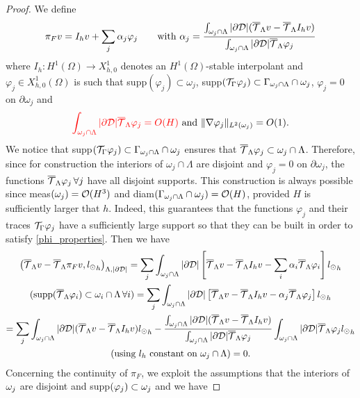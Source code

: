 \begin{proof}
We define
\begin{equation*}
\pi_F v = I_h v + \sum _j \alpha _j \varphi _j \qquad \text{with }\alpha_j =\frac{\int_{\omega _j \cap \Lambda}|\partial\mathcal{D}| ({\overline{\mathcal{T}}_\Lambda} v-{\overline{\mathcal{T}}_\Lambda} I_h v)}{\int_{\omega _j \cap \Lambda}|\partial\mathcal{D}|{\overline{\mathcal{T}}_\Lambda} \varphi _j}
\end{equation*}
where $I_h: H^1(\Omega) \rightarrow X_{h,0}^1$ denotes an $H^1(\Omega)$-stable interpolant
and $\varphi_j \in X_{h,0}^1(\Omega)$ is such that supp$(\varphi_j)\subset \omega_j$, supp$({\mathcal{T}_\Gamma} \varphi _j) \subset \Gamma_{\omega _j\cap \Lambda}\cap \omega_j$, $\varphi_j =0$ on $\partial \omega _j$ and 
\begin{equation}\label{phi_properties}
 {\color{red}\int_{\patch\cap \Lambda}|\DD|\mtrace \varphi_j=O(H)} \text{ and } \|\nabla \varphi _j\|_{L^2(\omega _j)}=O(1). 
\end{equation}
We notice that supp$({\mathcal{T}_\Gamma} \varphi_j) \subset \Gamma_{\omega _j\cap \Lambda}\cap \omega_j$ ensures that ${\overline{\mathcal{T}}_\Lambda} \varphi_j \subset \omega_j\cap \Lambda$. Therefore, since for construction the interiors of $\omega_j\cap \Lambda$  are disjoint and $\varphi _j = 0 $ on $\partial \omega_j$,  the functions ${\overline{\mathcal{T}}_\Lambda} \varphi_j\, \forall j$ have all disjoint supports. This construction is always possible since meas$(\omega _j) = \mathcal{O}(H^3)$ and diam$(\Gamma_{\omega _j\cap \Lambda} \cap \omega_j)=\mathcal{O}(H)$, provided $H$ is sufficiently larger that $h$. Indeed, this guarantees that the functions $\varphi _j$ and their traces ${\mathcal{T}_\Gamma} \varphi _j$ have a sufficiently large support so that they can be built in order to satisfy \eqref{phi_properties}.
Then we have
\begin{multline*}
\left({\overline{\mathcal{T}}_\Lambda} v - {\overline{\mathcal{T}}_\Lambda} \pi _F v  , {l_{\odot}}_h\right)_{\Lambda, |\partial\mathcal{D}|} = \sum _j \int_{\omega _j\cap \Lambda} |\partial\mathcal{D} |\left[ {\overline{\mathcal{T}}_\Lambda} v-{\overline{\mathcal{T}}_\Lambda} I_h v-\sum _i \alpha_i {\overline{\mathcal{T}}_\Lambda} \varphi _i \right]{l_{\odot}}_h \\
(\text{supp} ({\overline{\mathcal{T}}_\Lambda} \varphi _i )\subset \omega _i\cap \Lambda \, \forall i)  =\sum _j \int_{\omega _j\cap \Lambda}|\partial\mathcal{D}| \left[ {\overline{\mathcal{T}}_\Lambda} v-{\overline{\mathcal{T}}_\Lambda} I_h v-\alpha_j {\overline{\mathcal{T}}_\Lambda} \varphi _j \right]{l_{\odot}}_h\\
=\sum _j \int_{\omega _j\cap \Lambda} |\partial\mathcal{D}| ({\overline{\mathcal{T}}_\Lambda} v-{\overline{\mathcal{T}}_\Lambda}  I_h v) {l_{\odot}}_h - \frac{\int_{\omega _j\cap \Lambda} |\partial\mathcal{D}| ({\overline{\mathcal{T}}_\Lambda} v-{\overline{\mathcal{T}}_\Lambda} I_h v)}{\int_{\omega _j\cap \Lambda}|\partial\mathcal{D}|{\overline{\mathcal{T}}_\Lambda} \varphi _j} \int_{\omega _j\cap \Lambda} |\partial\mathcal{D}|{\overline{\mathcal{T}}_\Lambda} \varphi _j{l_{\odot}}_h\\ 
(\text{using $l_h$ constant on $\omega _j\cap \Lambda$})=0.
\end{multline*}
Concerning the continuity of $\pi_F$, we exploit the assumptions that the interiors of $\omega _j$ are disjoint and supp$(\varphi _j) \subset \omega _j$ and we have

\end{proof}
